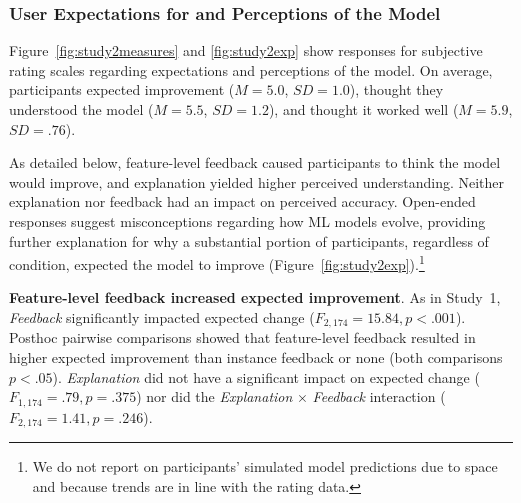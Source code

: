 \subsubsection{User Expectations for and Perceptions of the Model}
Figure~\ref{fig:study2measures} and \ref{fig:study2exp} show responses for subjective rating scales regarding expectations and perceptions of the model. On average, participants expected improvement ($M=5.0$, $SD=1.0$), thought they understood the model ($M=5.5$, $SD=1.2$), and thought it worked well ($M=5.9$, $SD=.76$).

As detailed below, feature-level feedback caused participants to think the model would improve, and explanation yielded higher perceived understanding. Neither explanation nor feedback had an impact on perceived accuracy. Open-ended responses suggest misconceptions regarding how ML models evolve, providing further explanation for why a substantial portion of participants, regardless of condition, expected the model to improve (Figure~\ref{fig:study2exp}).\footnote{We do not report on participants' simulated model predictions due to space and because trends are in line with the rating data.}  

\textbf{Feature-level feedback increased expected improvement}.
%
As in Study~1, \textit{Feedback} significantly impacted expected change ($F_{2,174}=15.84, p < .001$). Posthoc pairwise comparisons showed that feature-level feedback resulted in higher expected improvement than instance feedback or none (both comparisons $p<.05$). \textit{Explanation} did not have a significant impact on expected change ($F_{1,174}=.79, p=.375$) nor did the \textit{Explanation} $\times$ \textit{Feedback} interaction ($F_{2,174}=1.41, p=.246$).

%

